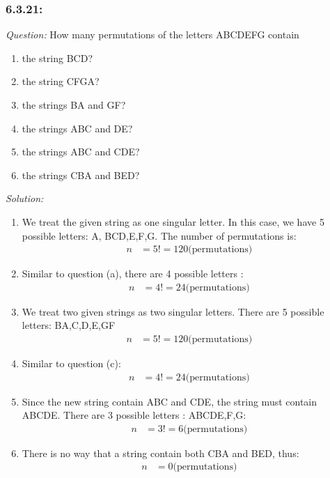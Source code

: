 \documentclass[a4paper]{article}
\begin{document}
	\subsubsection*{6.3.21:}
	\textit{Question:} How many permutations of the letters ABCDEFG contain
	\begin{enumerate} [label = (\alph*)]
		\item the string BCD?
		\item the string CFGA?
		\item the strings BA and GF?
		\item the strings ABC and DE?
		\item the strings ABC and CDE?
		\item the strings CBA and BED?
	\end{enumerate}
	\textit{Solution:} 
	\begin{enumerate} [label = (\alph*)]
		\item We treat the given string as one singular letter. In this case, we have 5 possible letters: A, BCD,E,F,G. The number of permutations is: 
		\begin{align*}
		n &= 5! = 120 \text{(permutations)}
		\end{align*}
		\item Similar to question (a), there are 4 possible letters :
		\begin{align*}
		n &= 4! = 24 \text{(permutations)}
		\end{align*}
		\item We treat two given strings as two singular letters. There are 5 possible letters: BA,C,D,E,GF
		\begin{align*}
		n &= 5! = 120 \text{(permutations)}
		\end{align*}
		\item Similar to question (c):
		\begin{align*}
		n &= 4! = 24 \text{(permutations)}
		\end{align*}
		\item Since the new string contain ABC and CDE, the string must contain ABCDE. There are 3 possible letters : ABCDE,F,G:
		\begin{align*}
		n &= 3! = 6 \text{(permutations)}
		\end{align*}
		\item There is no way that a string contain both CBA and BED, thus:
		\begin{align*}
		n &= 0 \text{(permutations)}
		\end{align*}
	\end{enumerate}
\end{document}
